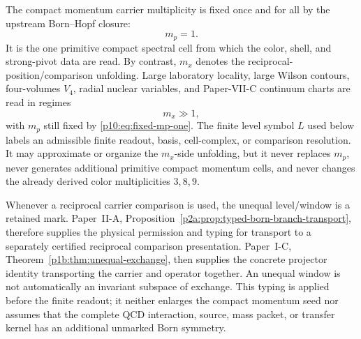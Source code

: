 \documentclass[12pt,a4paper]{article}
\begin{document}
\begin{definition}
\label{p10:def:fixed-mp-large-mx}
The compact momentum carrier multiplicity is fixed once and for all by the upstream Born--Hopf closure:
\begin{equation}
\label{p10:eq:fixed-mp-one}
m_p=1.
\end{equation}
It is the one primitive compact spectral cell from which the color, shell, and strong-pivot data are read.  By contrast, \(m_x\) denotes the reciprocal-position/comparison unfolding.  Large laboratory locality, large Wilson contours, four-volumes \(V_4\), radial nuclear variables, and Paper-VII-C continuum charts are read in regimes
\begin{equation}
\label{p10:eq:large-mx-position-unfolding}
m_x\gg1,
\end{equation}
with \(m_p\) still fixed by \eqref{p10:eq:fixed-mp-one}.  The finite level symbol \(L\) used below labels an admissible finite readout, basis, cell-complex, or comparison resolution.  It may approximate or organize the \(m_x\)-side unfolding, but it never replaces \(m_p\), never generates additional primitive compact momentum cells, and never changes the already derived color multiplicities \(3,8,9\).
\end{definition}

Whenever a reciprocal carrier comparison is used, the unequal level/window is
a retained mark.  Paper~II-A,
Proposition~\ref{p2a:prop:typed-born-branch-transport}, therefore supplies
the physical permission and typing for transport to a separately certified
reciprocal comparison presentation.  Paper~I-C,
Theorem~\ref{p1b:thm:unequal-exchange}, then supplies the concrete projector
identity transporting the carrier and operator together.  An unequal window
is not automatically an invariant subspace of exchange.  This typing is
applied before the finite readout; it neither enlarges the compact momentum
seed nor assumes that the complete QCD interaction, source, mass packet, or
transfer kernel has an additional unmarked Born symmetry.
\end{document}
